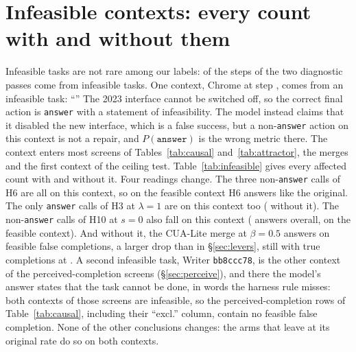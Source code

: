 \section{Infeasible contexts: every count with and without them}
\label{app:infeasible}
Infeasible tasks are not rare among our labels: \fsLabelsInfeasible{} of the \fsLabelsAll{} \fsp{} steps of the two diagnostic passes come from infeasible tasks. One \fsp{} context, Chrome \texttt{\infTask} at step \infStep, comes from an infeasible task: ``\infTaskInstruction'' The 2023 interface cannot be switched off, so the correct final action is \texttt{answer} with a statement of infeasibility. The model instead claims that it disabled the new interface, which is a false success, but a non-\texttt{answer} action on this context is not a repair, and $P(\texttt{answer})$ is the wrong metric there. %
The context enters most screens of Tables~\ref{tab:causal} and~\ref{tab:attractor}, the merges and the first context of the ceiling test. Table~\ref{tab:infeasible} gives every affected count with and without it. Four readings change. The three non-\texttt{answer} calls of H6 are all on this context, so on the feasible \fsp{} context H6 answers \infFreeHsixExcl{} like the original. The only \texttt{answer} calls of H3 at $\lambda=1$ are on this context too (\infFreeHthreefullExcl{} without it). The \fsp{} non-\texttt{answer} calls of H10 at $s=0$ also fall on this context (\infFreeHtenzeroAll{} answers overall, \infFreeHtenzeroExcl{} on the feasible context). And without it, the CUA-Lite \citep{cualite2026} merge at $\beta=0.5$ answers on \infMergeCuaHalfExcl{} feasible false completions, a larger drop than in \S\ref{sec:levers}, still with true completions at \mergeCuaFsm. A second infeasible task, Writer \texttt{bb8ccc78}, is the other \fsp{} context of the perceived-completion screens (\S\ref{sec:perceive}), and there the model's answer states that the task cannot be done, in words the harness rule misses: both \fsp{} contexts of those screens are infeasible, so the perceived-completion rows of Table~\ref{tab:causal}, including their ``excl.'' column, contain no feasible false completion. %
None of the other conclusions changes: the arms that leave \fsp{} at its original rate do so on both contexts. %

